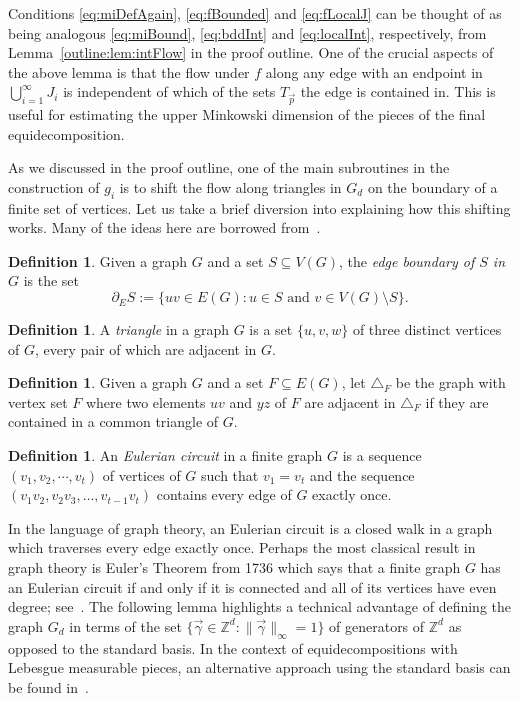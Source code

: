 \documentclass[12pt,a4paper]{amsart}
\numberwithin{equation}{section}
\theoremstyle{definition}
\newtheorem{defn}[equation]{Definition}
\begin{document}
Conditions \eqref{eq:miDefAgain}, \eqref{eq:fBounded} and \eqref{eq:fLocalJ} can be thought of as being analogous \eqref{eq:miBound}, \eqref{eq:bddInt} and \eqref{eq:localInt}, respectively, from Lemma~\ref{outline:lem:intFlow} in the proof outline. One of the crucial aspects of the above lemma is that the flow under $f$ along any edge with an endpoint in $\bigcup_{i=1}^\infty J_i$ is independent of which of the sets $T_{\vec{p}}$ the edge is contained in. This is useful for estimating the upper Minkowski dimension of the pieces of the final equidecomposition. 

As we discussed in the proof outline, one of the main subroutines in the construction of $g_i$ is to shift the flow along triangles in $G_d$ on the boundary of a finite set of vertices. Let us take a brief diversion into explaining how this shifting works. Many of the ideas here are borrowed from~\cite[Section~5]{MarksUnger17}. 

\begin{defn}
\label{def:edgeBoundary}
Given a graph $G$ and a set $S\subseteq V(G)$,  the \emph{edge boundary of $S$ in $G$} is the set 
\[\partial_ES:=\{uv\in E(G): u\in S\text{ and }v\in V(G)\setminus S\}.\]
\end{defn}

\begin{defn}
A \emph{triangle} in a graph $G$ is a set $\{u,v,w\}$ of three distinct vertices of $G$, every pair of which are adjacent in $G$.
\end{defn}

\begin{defn}
Given a graph $G$ and a set $F\subseteq E(G)$, let $\triangle_F$ be the graph with vertex set $F$ where two elements $uv$ and $yz$ of $F$ are adjacent in $\triangle_F$ if they are contained in a common triangle of $G$.
\end{defn}


\begin{defn}
An \emph{Eulerian circuit} in a finite graph $G$ is a sequence $(v_1,v_2,\cdots, v_{t})$ of vertices of $G$ such that $v_1=v_{t}$ and the sequence $(v_1v_2,v_2v_3,\dots,v_{t-1}v_t)$ contains every edge of $G$ exactly once. 
\end{defn}

In the language of graph theory, an Eulerian circuit is a closed walk in a graph which traverses every edge exactly once. Perhaps the most classical result in graph theory is Euler's Theorem from 1736 which says that a finite graph $G$ has an Eulerian circuit if and only if it is connected and all of its vertices have even degree; see~\cite[Theorem~1.8.1]{Diestel5th}. The following lemma highlights a technical advantage of defining the graph $G_d$ in terms of the set $\{\vec{\gamma}\in \mathbb{Z}^d: \|\vec{\gamma}\|_\infty=1\}$ of generators of $\mathbb{Z}^d$ as opposed to the standard basis. In the context of equidecompositions with Lebesgue measurable pieces, an alternative approach using the standard basis can be found in~\cite[Section 5]{CieslaSabok19}. 
\end{document}
